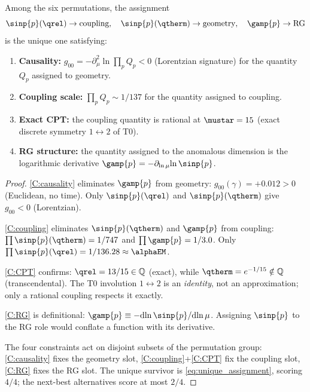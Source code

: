\documentclass[12pt,a4paper]{article}
\begin{document}
\begin{theorem}
\label{thm:C2_bridge}
Among the six permutations, the assignment
\begin{equation}
  \sinp{p}(\qrel) \to \text{coupling},\quad
  \sinp{p}(\qtherm) \to \text{geometry},\quad
  \gamp{p} \to \text{RG}
  \label{eq:unique_assignment}
\end{equation}
is the unique one satisfying:
\begin{enumerate}[nosep,label=(C\arabic*)]
\item\label{C:causality}
  \textbf{Causality:}
  $g_{00} = -\partial^2_\mu\!\ln\!\prod_p Q_p < 0$
  (Lorentzian signature) for the quantity $Q_p$ assigned to
  geometry.
\item\label{C:coupling}
  \textbf{Coupling scale:}
  $\prod_p Q_p \sim 1/137$ for the quantity assigned to coupling.
\item\label{C:CPT}
  \textbf{Exact CPT:}
  the coupling quantity is rational at $\mustar = 15$
  (exact discrete symmetry $1\leftrightarrow 2$ of T0).
\item\label{C:RG}
  \textbf{RG structure:}
  the quantity assigned to the anomalous dimension is the
  logarithmic derivative
  $\gamp{p} = -\partial_{\ln\mu}\!\ln\sinp{p}$.
\end{enumerate}
\end{theorem}

\begin{proof}
\ref{C:causality} eliminates $\gamp{p}$ from geometry:
$g_{00}(\gamma) = +0.012 > 0$ (Euclidean, no time).
Only $\sinp{p}(\qrel)$ and $\sinp{p}(\qtherm)$ give
$g_{00} < 0$ (Lorentzian).

\ref{C:coupling} eliminates $\sinp{p}(\qtherm)$ and $\gamp{p}$
from coupling: $\prod\sinp{p}(\qtherm) = 1/747$
and $\prod\gamp{p} = 1/3.0$.  Only
$\prod\sinp{p}(\qrel) = 1/136.28 \approx \alphaEM$.

\ref{C:CPT} confirms: $\qrel = 13/15 \in \mathbb{Q}$
(exact), while $\qtherm = e^{-1/15} \notin \mathbb{Q}$
(transcendental).  The T0 involution $1\leftrightarrow 2$ is
an \emph{identity}, not an approximation; only a rational
coupling respects it exactly.

\ref{C:RG} is definitional:
$\gamp{p} \equiv -\mathrm{d}\!\ln\sinp{p}/\mathrm{d}\!\ln\mu$.
Assigning $\sinp{p}$ to the RG role would conflate a
function with its derivative.

The four constraints act on disjoint subsets of the permutation
group: \ref{C:causality} fixes the geometry slot,
\ref{C:coupling}+\ref{C:CPT} fix the coupling slot,
\ref{C:RG} fixes the RG slot.  The unique survivor is
\eqref{eq:unique_assignment}, scoring $4/4$; the next-best
alternatives score at most $2/4$.
\end{proof}
\end{document}
